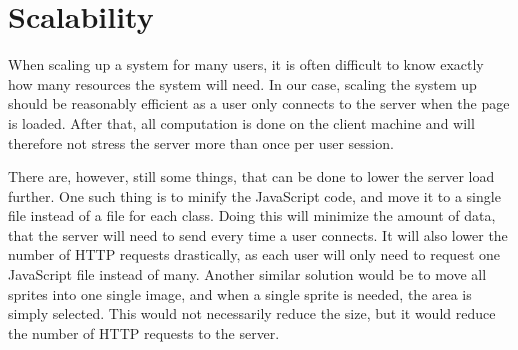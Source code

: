 \section{Scalability}
When scaling up a system for many users, it is often difficult to know exactly how many resources the system will need.
In our case, scaling the system up should be reasonably efficient as a user only connects to the server when the page is loaded.
After that, all computation is done on the client machine and will therefore not stress the server more than once per user session.\newline

There are, however, still some things, that can be done to lower the server load further.
One such thing is to minify the JavaScript code, and move it to a single file instead of a file for each class.
Doing this will minimize the amount of data, that the server will need to send every time a user connects.
It will also lower the number of HTTP requests drastically, as each user will only need to request one JavaScript file instead of many.
Another similar solution would be to move all sprites into one single image, and when a single sprite is needed, the area is simply selected. This would not necessarily reduce the size, but it would reduce the number of HTTP requests to the server.